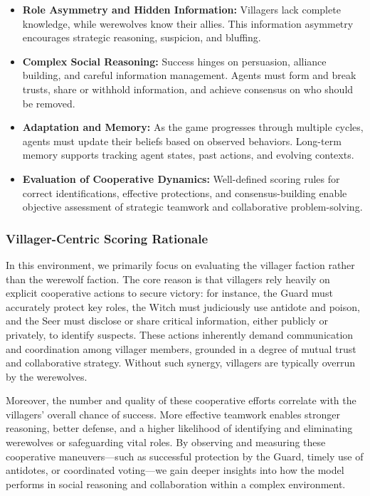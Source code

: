\begin{itemize}
    \item \textbf{Role Asymmetry and Hidden Information:} Villagers lack complete knowledge, while werewolves know their allies. This information asymmetry encourages strategic reasoning, suspicion, and bluffing.
    \item \textbf{Complex Social Reasoning:} Success hinges on persuasion, alliance building, and careful information management. Agents must form and break trusts, share or withhold information, and achieve consensus on who should be removed.
    \item \textbf{Adaptation and Memory:} As the game progresses through multiple cycles, agents must update their beliefs based on observed behaviors. Long-term memory supports tracking agent states, past actions, and evolving contexts.
    \item \textbf{Evaluation of Cooperative Dynamics:} Well-defined scoring rules for correct identifications, effective protections, and consensus-building enable objective assessment of strategic teamwork and collaborative problem-solving.
\end{itemize}

\subsubsection{Villager-Centric Scoring Rationale}

In this environment, we primarily focus on evaluating the villager faction rather than the werewolf faction. The core reason is that villagers rely heavily on explicit cooperative actions to secure victory: for instance, the Guard must accurately protect key roles, the Witch must judiciously use antidote and poison, and the Seer must disclose or share critical information, either publicly or privately, to identify suspects. These actions inherently demand communication and coordination among villager members, grounded in a degree of mutual trust and collaborative strategy. Without such synergy, villagers are typically overrun by the werewolves.

Moreover, the number and quality of these cooperative efforts correlate with the villagers’ overall chance of success. More effective teamwork enables stronger reasoning, better defense, and a higher likelihood of identifying and eliminating werewolves or safeguarding vital roles. By observing and measuring these cooperative maneuvers—such as successful protection by the Guard, timely use of antidotes, or coordinated voting—we gain deeper insights into how the model performs in social reasoning and collaboration within a complex environment.

